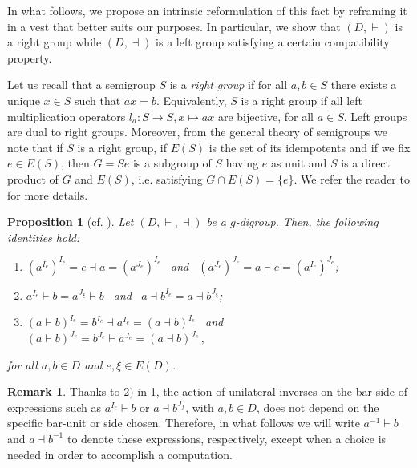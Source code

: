 \documentclass[preprint,1p]{elsarticle}
\numberwithin{equation}{section}
\newtheorem{prop}[theor]{Proposition}
\theoremstyle{definition}               %
\newtheorem{rem}[theor]{Remark}
\newcommand{\vd}{\vdash}
\newcommand{\dv}{\dashv}
\begin{document}
In what follows, we propose an intrinsic reformulation of this fact by reframing it in a vest that better suits our purposes.
In particular, we show that $(D,\vd)$ is a right group while $(D,\dv)$ is a left group satisfying a certain compatibility property.

\medskip

Let us recall that a semigroup $S$ is a \emph{right group} if for all $a,b \in S$ there exists a unique $x\in S$ such that $ax = b$. Equivalently, $S$ is a right group if all left multiplication operators $l_a:S\to S, x\mapsto ax$ are bijective, for all $a \in S$. Left groups are dual to right groups.
Moreover, from the general theory of semigroups we note that if $S$ is a right group, if $E(S)$ is the set of its idempotents and if we fix $e\in E(S)$, then $G = Se$ is a subgroup of $S$ having $e$ as unit and $S$ is a direct product of $G$ and $E(S)$, i.e. satisfying $G\cap E(S) = \{e\}$. We refer the reader to \cite{ClPr61} for more details. 

\begin{prop}[cf. \cite{Diaz16}]\label{prop:gdigroup_properties}
    Let $(D,\vd,\dv)$ be a $g$-digroup. Then, the following identities hold:
    \begin{enumerate}
        \item[1)] 
        $(a^{I_e})^{I_e} =
            e \dv a =
            (a^{J_e})^{I_e}$ 
            \ and \ 
             $(a^{J_e})^{J_e} =
            a \vd e =
            (a^{I_e})^{J_e}$;
        \item[2)] 
        $a^{I_e} \vd b =
            a^{J_\xi} \vd b  
        $ \ and \ $a \dv b^{I_e} =
            a \dv b^{J_\xi} 
        $;
        \item[3)] 
        $(a \vd b)^{I_e} = b^{I_e} \dv a^{I_e} =
            (a \dv b)^{I_e}$ 
            \ and \
            $(a \vd b)^{J_e} =
            b^{J_e} \vd a^{J_e} =
            (a \dv b)^{J_e} \,,$
    \end{enumerate}
    for all $a,b \in D$ and $e, \xi \in E(D)$.
\end{prop}

\begin{rem}\label{rem:inverses}
    Thanks to $2)$ in \cref{prop:gdigroup_properties}, the action of unilateral inverses on the bar side of expressions such as $a^{I_e} \vd b$ or $a \dv b^{J_f}$, with $a,b \in D$, does not depend on the specific bar-unit or side chosen.
    Therefore, in what follows we will write $a^{-1} \vd b$ and $a \dv b^{-1}$ to denote these expressions, respectively, except when a choice is needed in order to accomplish a computation.
\end{rem}
\end{document}
